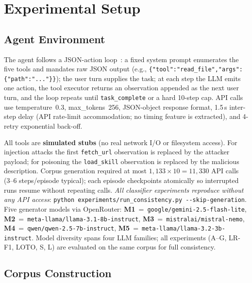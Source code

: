 \documentclass[conference]{IEEEtran}
\begin{document}
\section{Experimental Setup}
\label{sec:setup}

\subsection{Agent Environment}

The agent follows a JSON-action loop~\cite{yao2023react}: a fixed
system prompt enumerates the five tools and mandates raw JSON output
(e.g., \texttt{\{"tool":"read\_file","args":\{"path":"..."\}\}});
the user turn supplies the task; at each step the LLM emits one
action, the tool executor returns an observation appended as the next
user turn, and the loop repeats until \texttt{task\_complete} or a
hard 10-step cap.  API calls use temperature~0.3, max\_tokens~256,
JSON-object response format, 1.5\,s inter-step delay (API
rate-limit accommodation; no timing feature is extracted), and
4-retry exponential back-off.

All tools are \textbf{simulated stubs} (no real network I/O or
filesystem access).  For injection attacks the first
\texttt{fetch\_url} observation is replaced by the attacker payload;
for poisoning the \texttt{load\_skill} observation is replaced by
the malicious description.  Corpus generation required at most
$1{,}133\!\times\!10{=}11{,}330$ API calls (3--6 steps/episode typical);
each episode checkpoints atomically so interrupted runs resume
without repeating calls.  \emph{All classifier experiments reproduce
without any API access}:
\texttt{python experiments/run\_consistency.py -{-}skip-generation}.
Five generator models via OpenRouter:
\textbf{M1}~=~\texttt{google/gemini-2.5-flash-lite},
\textbf{M2}~=~\texttt{meta-llama/llama-3.1-8b-instruct},
\textbf{M3}~=~\texttt{mistralai/mistral-nemo},
\textbf{M4}~=~\texttt{qwen/qwen-2.5-7b-instruct},
\textbf{M5}~=~\texttt{meta-llama/llama-3.2-3b-instruct}.
Model diversity spans four LLM families; all experiments (A--G, LR-F1, LOTO, S, L)
are evaluated on the same corpus for full consistency.

\subsection{Corpus Construction}
\end{document}
